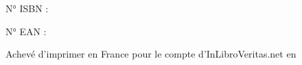 {\NoAutoSpaceBeforeFDP {}\AutoSpaceBeforeFDP}
\printindex
\tableofcontents
\newpage
\thispagestyle{empty}
\null{}
\MakeTitre{} \version{}\par
{}
N° ISBN : \isbn{}\par
N° EAN : \ean{}\par
{}
Achevé d'imprimer en France pour le compte d'InLibroVeritas.net en \anneedepot{}\par
{}

